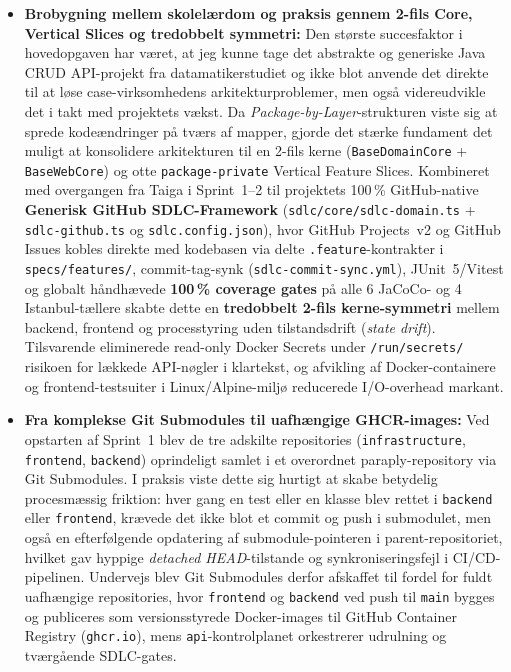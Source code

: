 \documentclass[11pt,a4paper]{article}
\begin{document}
\begin{table}[htbp]
\begin{table}[htbp]
\begin{itemize}[noitemsep]
    \item \textbf{Brobygning mellem skolelærdom og praksis gennem 2-fils Core, Vertical Slices og tredobbelt symmetri:} Den største succesfaktor i hovedopgaven har været, at jeg kunne tage det abstrakte og generiske Java CRUD API-projekt fra datamatikerstudiet og ikke blot anvende det direkte til at løse case-virksomhedens arkitekturproblemer, men også videreudvikle det i takt med projektets vækst. Da \textit{Package-by-Layer}-strukturen viste sig at sprede kodeændringer på tværs af mapper, gjorde det stærke fundament det muligt at konsolidere arkitekturen til en 2-fils kerne (\texttt{BaseDomainCore} + \texttt{BaseWebCore}) og otte \texttt{package-private} Vertical Feature Slices. Kombineret med overgangen fra Taiga i Sprint~1--2 til projektets 100\,\% GitHub-native \textbf{Generisk GitHub SDLC-Framework} (\texttt{sdlc/core/sdlc-domain.ts} + \texttt{sdlc-github.ts} og \texttt{sdlc.config.json}), hvor GitHub Projects~v2 og GitHub Issues kobles direkte med kodebasen via delte \texttt{.feature}-kontrakter i \texttt{specs/features/}, commit-tag-synk (\texttt{sdlc-commit-sync.yml}), JUnit~5/Vitest og globalt håndhævede \textbf{100\,\% coverage gates} på alle 6 JaCoCo- og 4 Istanbul-tællere skabte dette en \textbf{tredobbelt 2-fils kerne-symmetri} mellem backend, frontend og processtyring uden tilstandsdrift (\textit{state drift}). Tilsvarende eliminerede read-only Docker Secrets under \texttt{/run/secrets/} risikoen for lækkede API-nøgler i klartekst, og afvikling af Docker-containere og frontend-testsuiter i Linux/Alpine-miljø reducerede I/O-overhead markant.
    \item \textbf{Fra komplekse Git Submodules til uafhængige GHCR-images:} Ved opstarten af Sprint~1 blev de tre adskilte repositories (\texttt{infrastructure}, \texttt{frontend}, \texttt{backend}) oprindeligt samlet i et overordnet paraply-repository via Git Submodules. I praksis viste dette sig hurtigt at skabe betydelig procesmæssig friktion: hver gang en test eller en klasse blev rettet i \texttt{backend} eller \texttt{frontend}, krævede det ikke blot et commit og push i submodulet, men også en efterfølgende opdatering af submodule-pointeren i parent-repositoriet, hvilket gav hyppige \textit{detached HEAD}-tilstande og synkroniseringsfejl i CI/CD-pipelinen. Undervejs blev Git Submodules derfor afskaffet til fordel for fuldt uafhængige repositories, hvor \texttt{frontend} og \texttt{backend} ved push til \texttt{main} bygges og publiceres som versionsstyrede Docker-images til GitHub Container Registry (\texttt{ghcr.io}), mens \texttt{api}-kontrolplanet orkestrerer udrulning og tværgående SDLC-gates.

\end{itemize}
\end{table}
\end{table}
\end{document}
